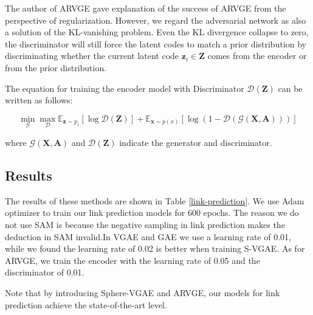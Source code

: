 \documentclass[fleqn,10pt]{SelfArx} %
\begin{document}
The author of ARVGE gave explanation of the success of ARVGE from the perspective of regularization. However, we regard the adversarial network as also a solution of the KL-vanishing problem. Even the KL divergence collapse to zero, the discriminator will still force the latent codes to match a prior distribution
by discriminating whether the current latent code $\textbf{z}_i \in \textbf{Z}$ comes from the encoder or from the prior distribution.

The equation for training the encoder model with Discriminator $\mathcal{D}(\textbf{Z})$ can be
written as follows:
\begin{small}
\begin{equation}
\min_{\mathcal{G}} \max_{\mathcal{D}} \mathbb{E}_{\textbf{z} \sim  p_{z}} [\log \mathcal{D}(\textbf{Z})] + \mathbb{E}_{\textbf{x} \sim p(x)} [\log (1 - \mathcal{D}(\mathcal{G}(\textbf{X}, \textbf{A})) )]
\end{equation}
\end{small}
where $\mathcal{G}(\textbf{X}, \textbf{A})$ and $\mathcal{D}(\textbf{Z})$ indicate the generator and discriminator.

\subsection{Results}
The results of these methods are shown in Table \ref{link-prediction}.
We use Adam optimizer to train our link prediction models for 600 epochs. The reason we do not use SAM is because the negative sampling in link prediction makes the deduction in SAM invalid.In VGAE and GAE we use a learning rate of 0.01, while we found the learning rate of 0.02 is better when training S-VGAE. As for ARVGE, we train the encoder with the learning rate of 0.05 and the discriminator of 0.01.

\noindent
Note that by introducing Sphere-VGAE and ARVGE, our models for link prediction achieve the state-of-the-art level.
\begin{table}
	\centering
	\caption{Link prediction on Cora}
	\label{link-prediction}
\end{table}
\end{document}
